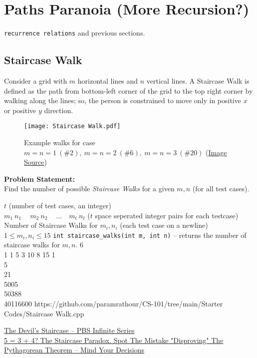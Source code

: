 \section{Paths Paranoia (More Recursion?)}{\label{sec:paths}}
\begin{topics}
\verb!recurrence relations! and previous sections.
\end{topics}	
\subsection{Staircase Walk}{\label{pp:staircasewalk}}
Consider a grid with $m$ horizontal lines and $n$ vertical lines. A Staircase Walk is defined as the path from bottom-left corner of the grid to the top right corner by walking along the lines; so, the person is constrained to move only in positive $x$ or positive $y$ direction.
\begin{figure}[H]
	\centering
	\texttt{[image: Staircase Walk.pdf]}
	\caption{Example walks for case $m=n=1\ (\#2),\ m=n=2\ (\#6),\ m=n=3\ (\#20)$ (\href{https://mathworld.wolfram.com/StaircaseWalk.html}{Image Source})}
	\label{fig:staircasewalk}
\end{figure}
\vspace{-1em}
\textbf{Problem Statement:}\\
Find the number of possible \emph{Staircase Walks} for a given $m,n$ (for all test cases).
\begin{testcasesFunction}
	{$t$ \hfill(number of test cases, an integer)\\
	$m_1\ n_1\ \quad m_2\ n_2\ \quad \ldots\quad m_t\ n_t$ \hfill($t$ space seperated integer pairs for each testcase)}
	{Number of Staircase Walks for $m_i, n_i$  \hfill(each test case on a newline)}
	{$1 \leq m_i, n_i \leq 15$}
	{\texttt{int staircase\_walks(int m, int n)} -- returns the number of staircase walks for $m,n$.}
	{6\\1 1 5 3 10 8 15}
	{1\\5\\21\\5005\\50388\\40116600}
	{https://github.com/paramrathour/CS-101/tree/main/Starter Codes/Staircase Walk.cpp}
\end{testcasesFunction}
\begin{funvideo}
\href{https://youtu.be/dQXVn7pFsVI}{The Devil's Staircase -- PBS Infinite Series}\\
\href{https://youtu.be/LWPOlZBXtD8}{5 = 3 + 4? The Staircase Paradox. Spot The Mistake "Disproving" The Pythagorean Theorem -- Mind Your Decisions}
\end{funvideo}
